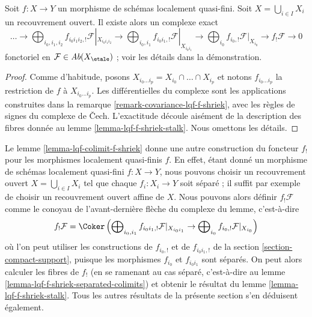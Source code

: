 \begin{lemma}
\label{lemma-lqf-colimit-f-shriek}
Soit $f : X \to Y$ un morphisme de schémas localement quasi-fini.
Soit $X = \bigcup_{i \in I} X_i$ un recouvrement ouvert. Il existe alors
un complexe exact
$$
\ldots \to
\bigoplus\nolimits_{i_0, i_1, i_2} f_{i_0i_1i_2, !}
\mathcal{F}|_{X_{i_0i_1i_2}} \to
\bigoplus\nolimits_{i_0, i_1} f_{i_0i_1, !} \mathcal{F}|_{X_{i_0i_1}} \to
\bigoplus\nolimits_{i_0} f_{i_0, !} \mathcal{F}|_{X_{i_0}}
\to f_!\mathcal{F} \to 0
$$
fonctoriel en $\mathcal{F} \in \textit{Ab}(X_\etale)$ ; voir les détails
dans la démonstration.
\end{lemma}

\begin{proof}
Comme d'habitude, posons $X_{i_0 \ldots i_p} = X_{i_0} \cap \ldots \cap X_{i_p}$
et notons $f_{i_0 \ldots i_p}$ la restriction de $f$ à
$X_{i_0 \ldots i_p}$. Les différentielles du complexe sont les applications
construites dans la remarque \ref{remark-covariance-lqf-f-shriek},
avec les règles de signes du complexe de {\v C}ech.
L'exactitude découle aisément de la description des fibres donnée au
lemme \ref{lemma-lqf-f-shriek-stalk}. Nous omettons les détails.
\end{proof}

\begin{remark}
\label{remark-alternative-lqf-f-shriek}
Le lemme \ref{lemma-lqf-colimit-f-shriek}
donne une autre construction du foncteur $f_!$
pour les morphismes localement quasi-finis $f$.
En effet, étant donné un morphisme de schémas localement quasi-fini $f : X \to Y$,
nous pouvons choisir un recouvrement ouvert $X = \bigcup_{i \in I} X_i$
tel que chaque $f_i : X_i \to Y$ soit séparé ; il suffit par exemple de choisir
un recouvrement ouvert affine de $X$. Nous
pouvons alors définir $f_!\mathcal{F}$ comme le conoyau de l'avant-dernière flèche
du complexe du lemme, c'est-à-dire
$$
f_!\mathcal{F} = \Coker\left(
\bigoplus\nolimits_{i_0, i_1} f_{i_0i_1, !} \mathcal{F}|_{X_{i_0i_1}} \to
\bigoplus\nolimits_{i_0} f_{i_0, !} \mathcal{F}|_{X_{i_0}}
\right)
$$
où l'on peut utiliser les constructions de $f_{i_0, !}$ et de
$f_{i_0i_1, !}$ de la section \ref{section-compact-support},
puisque les morphismes $f_{i_0}$ et $f_{i_0 i_1}$ sont séparés.
On peut alors calculer les fibres de $f_!$ (en se ramenant au cas séparé,
c'est-à-dire au lemme \ref{lemma-lqf-f-shriek-separated-colimits})
et obtenir le résultat du lemme \ref{lemma-lqf-f-shriek-stalk}.
Tous les autres résultats de la présente section s'en
déduisent également.
\end{remark}

